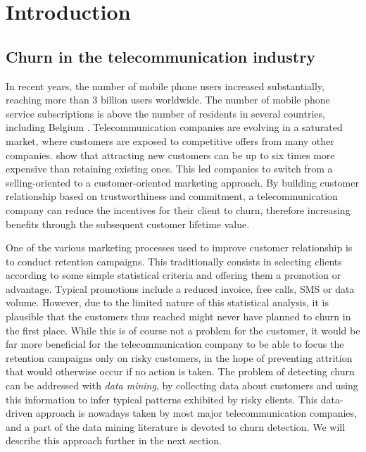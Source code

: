 \chapter{Introduction}
\label{ch:intro}

\section{Churn in the telecommunication industry}

In recent years, the number of mobile phone users increased substantially,
reaching more than 3 billion users worldwide. The number of mobile phone service
subscriptions is above the number of residents in several countries, including
Belgium \parencite{itu2018itu}. Telecommunication companies are evolving in a
saturated market, where customers are exposed to competitive offers from many
other companies. \textcite{hadden2007computer} show that attracting new
customers can be up to six times more expensive than retaining existing ones.
This led companies to switch from a selling-oriented to a customer-oriented
marketing approach. By building customer relationship based on trustworthiness
and commitment, a telecommunication company can reduce the incentives for their
client to churn, therefore increasing benefits through the subsequent customer
lifetime value.

One of the various marketing processes used to improve customer relationship is
to conduct retention campaigns. This traditionally consists in selecting clients
according to some simple statistical criteria and offering them a promotion or
advantage. Typical promotions include a reduced invoice, free calls, SMS or data
volume. However, due to the limited nature of this statistical analysis, it is
plausible that the customers thus reached might never have planned to churn
in the first place. While this is of course not a problem for the customer, it
would be far more beneficial for the telecommunication company to be able to
focus the retention campaigns only on risky customers, in the hope of preventing
attrition that would otherwise occur if no action is taken. The problem of
detecting churn can be addressed with \emph{data mining}, by collecting data
about customers and using this information to infer typical patterns exhibited
by risky clients. This data-driven approach is nowadays taken by most major
telecommunication companies, and a part of the data mining literature is devoted
to churn detection. We will describe this approach further in the next section.



